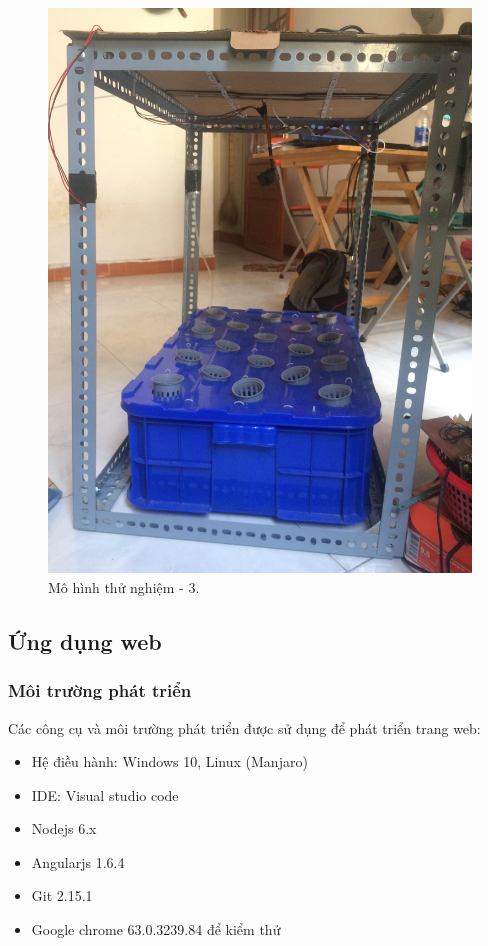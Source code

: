 \documentclass[a4paper,12pt,oneside]{article}
\begin{document}
\begin{enumerate}
			\begin{figure}[H]
			\centering
			\includegraphics[scale=.1]{hinh/mohinh_3.jpg}
			\caption{Mô hình thử nghiệm - 3.}
			\end{figure}
	\end{enumerate}

\newpage
\subsection{Ứng dụng web}
\subsubsection{Môi trường phát triển}
Các công cụ và môi trường phát triển được sử dụng để phát triển trang web:
\begin{itemize}
\item Hệ điều hành: Windows 10, Linux (Manjaro)
\item IDE: Visual studio code
\item Nodejs 6.x
\item Angularjs 1.6.4
\item Git 2.15.1
\item Google chrome 63.0.3239.84 để kiểm thử 
\end{itemize}
\end{document}
